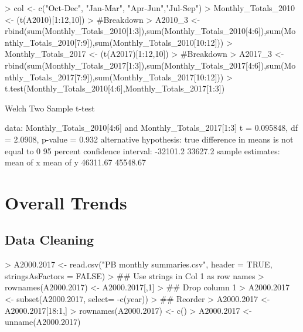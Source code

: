 \documentclass[letterpaper]{article}
\begin{document}
\begin{Schunk}
\begin{Sinput}
> col <- c("Oct-Dec", "Jan-Mar", "Apr-Jun","Jul-Sep")
> Monthly_Totals_2010 <- (t(A2010)[1:12,10])
>   #Breakdown 
>   A2010_3 <- rbind(sum(Monthly_Totals_2010[1:3]),sum(Monthly_Totals_2010[4:6]),sum(Monthly_Totals_2010[7:9]),sum(Monthly_Totals_2010[10:12]))
> Monthly_Totals_2017 <- (t(A2017)[1:12,10])
>   #Breakdown 
>   A2017_3 <- rbind(sum(Monthly_Totals_2017[1:3]),sum(Monthly_Totals_2017[4:6]),sum(Monthly_Totals_2017[7:9]),sum(Monthly_Totals_2017[10:12]))
> t.test(Monthly_Totals_2010[4:6],Monthly_Totals_2017[1:3])
\end{Sinput}
\begin{Soutput}
	Welch Two Sample t-test

data:  Monthly_Totals_2010[4:6] and Monthly_Totals_2017[1:3]
t = 0.095848, df = 2.0908, p-value = 0.932
alternative hypothesis: true difference in means is not equal to 0
95 percent confidence interval:
 -32101.2  33627.2
sample estimates:
mean of x mean of y 
 46311.67  45548.67 
\end{Soutput}
\end{Schunk}

\section{Overall Trends}

\subsection{Data Cleaning}
\begin{Schunk}
\begin{Sinput}
> A2000.2017 <- read.csv("PB monthly summaries.csv", header = TRUE, stringsAsFactors = FALSE)
> ## Use strings in Col 1 as row names
> rownames(A2000.2017) <- A2000.2017[,1]
> ## Drop column 1
> A2000.2017 <-  subset(A2000.2017, select= -c(year))
> ## Reorder
> A2000.2017 <- A2000.2017[18:1,]
> rownames(A2000.2017) <- c()
> A2000.2017 <- unname(A2000.2017)
\end{Sinput}
\end{Schunk}
\end{document}
